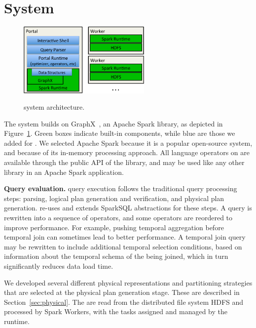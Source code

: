\section{System}
\label{sec:sys}

\begin{figure}[t!]
\begin{center}
\includegraphics[height=1.4in]{figs/architecture.pdf}
\caption{\ql system architecture.}
\vspace{-0.5cm}
\label{fig:arch}
\end{center}
\end{figure}

The \ql system builds on GraphX~\cite{DBLP:conf/osdi/GonzalezXDCFS14},
an Apache Spark library, as depicted in Figure~\ref{fig:arch}.  Green
boxes indicate built-in components, while blue are those we added for
\ql.  We selected Apache Spark because it is a popular open-source
system, and because of its in-memory processing approach.  All
language operators on \tgs are available through the public API of the
\ql library, and may be used like any other library in an Apache Spark
application.

{\bf Query evaluation.}  \ql query execution follows the traditional
query processing steps: parsing, logical plan generation and
verification, and physical plan generation.  \ql re-uses and extends
SparkSQL abstractions for these steps.  A \ql query is rewritten into
a sequence of operators, and some operators are reordered to improve
performance.  For example, pushing temporal aggregation before
temporal join can sometimes lead to better performance.  A temporal
join query may be rewritten to include additional temporal selection
conditions, based on information about the temporal schema of the \tgs
being joined, which in turn significantly reduces data load time.

We developed several different physical representations and
partitioning strategies that are selected at the physical plan
generation stage.  These are described in Section~\ref{sec:physical}.
The \tgs are read from the distributed file system HDFS and processed
by Spark Workers, with the tasks assigned and managed by the runtime.

